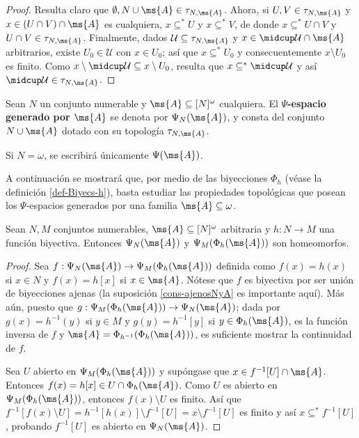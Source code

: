 	\begin{proof} 
		Resulta claro que $\emptyset, N \cup \ms{A} \in \tau_{N,\ms{A}}$. Ahora, si $U,V \in \tau_{N,\ms{A}}$ y $x \in (U \cap V) \cap \ms{A}$ es cualquiera, $x \subseteq^* U$ y $x \subseteq^* V$, de donde $x \subseteq^* U \cap V$ y $U \cap V \in \tau_{N,\ms{A}}$. Finalmente, dados $\mathcal{U}\subseteq \tau_{N,\ms{A}}$ y $x \in \midcup \mathcal{U} \cap \ms{A}$ arbitrarios, existe $U_0 \in \mathcal{U}$ con $x \in U_0$; así que $x \subseteq^* U_0$ y consecuentemente $x \setminus U_0$ es finito. Como $x \setminus \midcup \mathcal{U} \subseteq x \setminus U_0$, resulta que $x \subseteq^* \midcup \mathcal{U}$ y así $\midcup \mathcal{U} \in \tau_{N,\ms{A}}$.
	\end{proof}
	
	\begin{definicion}\label{Def-Mrowka}
		Sean $N$ un conjunto numerable y $\ms{A} \subseteq [N]^\omega$ cualquiera. El \textbf{$\Psi$-espacio} \textbf{generado por $\ms{A}$} se denota por $\Psi_N(\ms{A})$, y consta del conjunto $N \cup \ms{A}$ dotado con su topología $\tau_{N,\ms{A}}$.
		
		Si $N=\omega$, se escribirá únicamente $\Psi(\ms{A})$.	
	\end{definicion}
	
	A continuación se mostrará que, por medio de las biyecciones $\Phi_h$ (véase la definición \ref{def-Biyecs-h}), basta estudiar las propiedades topológicas que posean los $\Psi$-espacios generados por una familia $\ms{A} \subseteq \omega$.
	
	\begin{proposicion}\label{prop-MrowHomeoBiyec}
		Sean $N,M$ conjuntos numerables, $\ms{A} \subseteq [N]^\omega$ arbitraria y $h:N \to M$ una función biyectiva. Entonces $\Psi_N(\ms{A})$ y $\Psi_M(\Phi_h(\ms{A}))$ son homeomorfos.
	\end{proposicion}
	
	\begin{proof} 
		Sea $f:\Psi_N(\ms{A}) \to \Psi_M(\Phi_h(\ms{A}))$ definida como $f(x)=h(x)$ si $x \in N$ y $f(x)=h[x]$ si $x \in \ms{A}$. Nótese que $f$ es biyectiva por ser unión de biyecciones ajenas (la suposición \ref{cons-ajenosNyA} es importante aquí). Más aún, puesto que $g:\Psi_M(\Phi_h(\ms{A})) \to \Psi_N(\ms{A})$; dada por $g(x)=h^{-1}(y)$ si $y \in M$ y $g(y)=h^{-1}[y]$ si $y \in \Phi_h(\ms{A})$, es la función inversa de $f$ y $\ms{A}=\Phi_{h^{-1}}(\Phi_h(\ms{A}))$, es suficiente mostrar la continuidad de $f$.
	
		Sea $U$ abierto en $\Psi_M(\Phi_h(\ms{A}))$ y supóngase que $x \in f^{-1}[U] \cap \ms{A}$. Entonces $f(x) = h[x] \in U \cap \Phi_h(\ms{A})$. Como $U$ es abierto en $\Psi_M(\Phi_h(\ms{A}))$, entonces $f(x) \setminus U$ es finito. Así que $f^{-1}[f(x) \setminus U] = h^{-1}[h(x)] \setminus f^{-1}[U] = x \setminus f^{-1}[U]$ es finito y así $x \subseteq^* f^{-1}[U]$, probando $f^{-1}[U]$ es abierto en $\Psi_N(\ms{A})$.
	\end{proof} 
	
